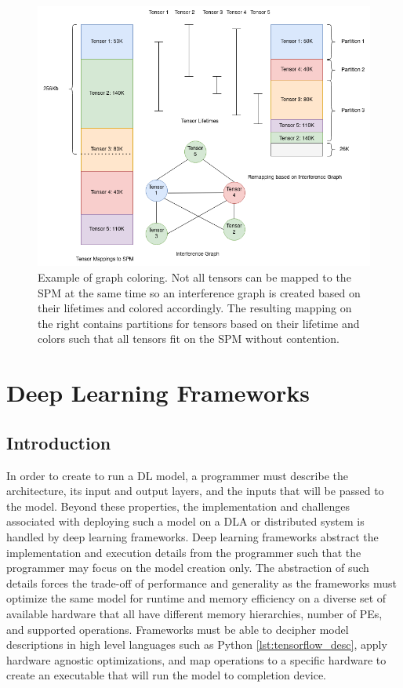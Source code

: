 \begin{figure}[thb!]
\centering
\includegraphics[scale=0.5]{Figures/graph_coloring_example.png}
\decoRule
\caption[graphColoring]{Example of graph coloring. Not all tensors can be
mapped to the SPM at the same time so an interference graph is created
based on their lifetimes and colored accordingly. The resulting mapping on the 
right contains partitions for tensors based on their lifetime and colors such that
all tensors fit on the SPM without contention.}
\label{fig:graph_color}
\end{figure}

\section{Deep Learning Frameworks}
\subsection{Introduction}
In order to create to run a DL model, a programmer must describe the
architecture, its input and output layers, and the inputs that will be passed
to the model. Beyond these properties, the implementation and challenges
associated with deploying such a model on a DLA or distributed system is
handled by deep learning frameworks. Deep learning frameworks abstract the
implementation and execution details from the programmer such that the
programmer may focus on the model creation only. The abstraction of such
details forces the trade-off of performance and generality as the frameworks
must optimize the same model for runtime and memory efficiency on a diverse set
of available hardware that all have different memory hierarchies, number of PEs,
and supported operations. Frameworks must be able to decipher model
descriptions in high level languages such as Python \ref{lst:tensorflow_desc}, apply hardware agnostic
optimizations, and map operations to a specific hardware to create an executable
that will run the model to completion device.

